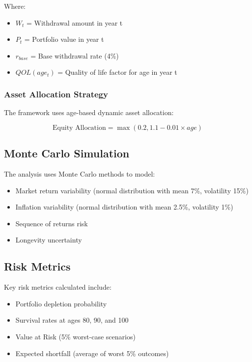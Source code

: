 \documentclass[11pt,a4paper]{article}
\begin{document}
Where:
\begin{itemize}
\item $W_t$ = Withdrawal amount in year t
\item $P_t$ = Portfolio value in year t  
\item $r_{base}$ = Base withdrawal rate (4\%)
\item $QOL(age_t)$ = Quality of life factor for age in year t
\end{itemize}

\subsubsection{Asset Allocation Strategy}

The framework uses age-based dynamic asset allocation:

\begin{equation}
\text{Equity Allocation} = \max(0.2, 1.1 - 0.01 \times age)
\end{equation}

\subsection{Monte Carlo Simulation}

The analysis uses Monte Carlo methods to model:
\begin{itemize}
\item Market return variability (normal distribution with mean 7\%, volatility 15\%)
\item Inflation variability (normal distribution with mean 2.5\%, volatility 1\%)
\item Sequence of returns risk
\item Longevity uncertainty
\end{itemize}

\subsection{Risk Metrics}

Key risk metrics calculated include:
\begin{itemize}
\item Portfolio depletion probability
\item Survival rates at ages 80, 90, and 100
\item Value at Risk (5\% worst-case scenarios)
\item Expected shortfall (average of worst 5\% outcomes)
\end{itemize}
\end{document}
